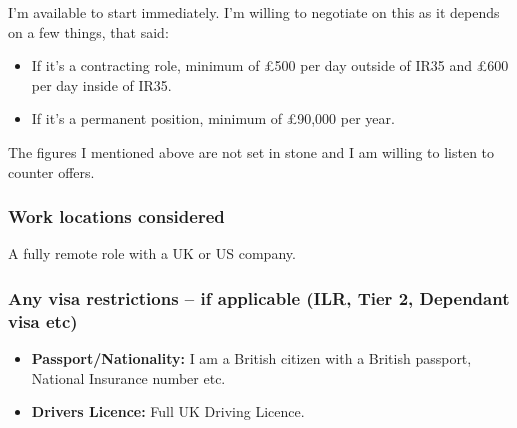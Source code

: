 \documentclass[
  a4paper,
]{article}
\providecommand{\tightlist}{%
  \setlength{\itemsep}{0pt}\setlength{\parskip}{0pt}}
\begin{document}
I'm available to start immediately. I'm willing to negotiate on this as
it depends on a few things, that said:

\begin{itemize}
\tightlist
\item
  If it's a contracting role, minimum of £500 per day outside of IR35
  and £600 per day inside of IR35.
\item
  If it's a permanent position, minimum of £90,000 per year.
\end{itemize}

The figures I mentioned above are not set in stone and I am willing to
listen to counter offers.

\hypertarget{work-locations-considered}{%
\subsubsection{Work locations
considered}\label{work-locations-considered}}

A fully remote role with a UK or US company.

\hypertarget{any-visa-restrictions-if-applicable-ilr-tier-2-dependant-visa-etc}{%
\subsubsection{Any visa restrictions -- if applicable (ILR, Tier 2,
Dependant visa
etc)}\label{any-visa-restrictions-if-applicable-ilr-tier-2-dependant-visa-etc}}

\begin{itemize}
\tightlist
\item
  \textbf{Passport/Nationality:} I am a British citizen with a British
  passport, National Insurance number etc.
\item
  \textbf{Drivers Licence:} Full UK Driving Licence.
\end{itemize}
\end{document}
